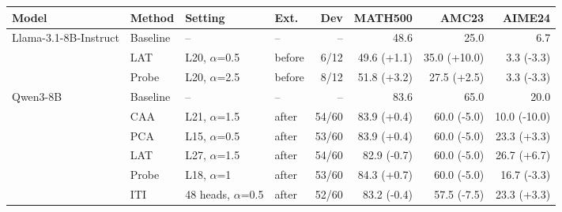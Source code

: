 \begin{tabular}{llllrrrr}
\toprule
Model & Method & Setting & Ext. & Dev & MATH500 & AMC23 & AIME24 \\
\midrule
Llama-3.1-8B-Instruct & Baseline & -- & -- & -- & 48.6 & 25.0 & 6.7 \\
 & LAT & L20, $\alpha$=0.5 & before & 6/12 & 49.6 (+1.1) & 35.0 (+10.0) & 3.3 (-3.3) \\
 & Probe & L20, $\alpha$=2.5 & before & 8/12 & 51.8 (+3.2) & 27.5 (+2.5) & 3.3 (-3.3) \\
\midrule
Qwen3-8B & Baseline & -- & -- & -- & 83.6 & 65.0 & 20.0 \\
 & CAA & L21, $\alpha$=1.5 & after & 54/60 & 83.9 (+0.4) & 60.0 (-5.0) & 10.0 (-10.0) \\
 & PCA & L15, $\alpha$=0.5 & after & 53/60 & 83.9 (+0.4) & 60.0 (-5.0) & 23.3 (+3.3) \\
 & LAT & L27, $\alpha$=1.5 & after & 54/60 & 82.9 (-0.7) & 60.0 (-5.0) & 26.7 (+6.7) \\
 & Probe & L18, $\alpha$=1 & after & 53/60 & 84.3 (+0.7) & 60.0 (-5.0) & 16.7 (-3.3) \\
 & ITI & 48 heads, $\alpha$=0.5 & after & 52/60 & 83.2 (-0.4) & 57.5 (-7.5) & 23.3 (+3.3) \\
\bottomrule
\end{tabular}
